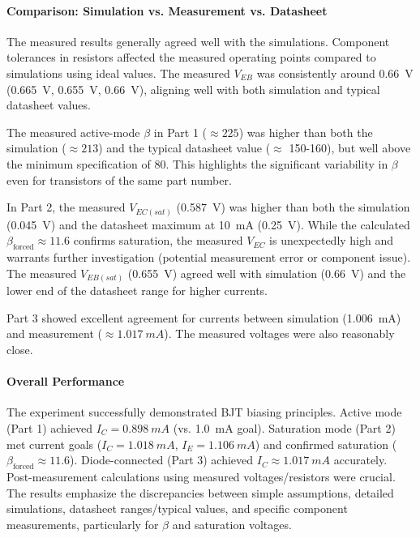 \documentclass[12pt]{article}
\begin{document}
\paragraph{Comparison: Simulation vs. Measurement vs. Datasheet}
The measured results generally agreed well with the simulations. Component tolerances in resistors affected the measured operating points compared to simulations using ideal values. The measured $V_{EB}$ was consistently around \SI{0.66}{\volt} (\SI{0.665}{\volt}, \SI{0.655}{\volt}, \SI{0.66}{\volt}), aligning well with both simulation and typical datasheet values.

The measured active-mode $\beta$ in Part 1 ($\approx 225$) was higher than both the simulation ($\approx 213$) and the typical datasheet value ($\approx$ 150-160), but well above the minimum specification of 80. This highlights the significant variability in $\beta$ even for transistors of the same part number.

In Part 2, the measured $V_{EC(sat)}$ (\SI{0.587}{\volt}) was higher than both the simulation (\SI{0.045}{\volt}) and the datasheet maximum at \SI{10}{mA} (\SI{0.25}{V}). While the calculated $\beta_{\text{forced}} \approx 11.6$ confirms saturation, the measured $V_{EC}$ is unexpectedly high and warrants further investigation (potential measurement error or component issue). The measured $V_{EB(sat)}$ (\SI{0.655}{\volt}) agreed well with simulation (\SI{0.66}{\volt}) and the lower end of the datasheet range for higher currents.

Part 3 showed excellent agreement for currents between simulation (\SI{1.006}{mA}) and measurement ($\approx \SI{1.017}{mA}$). The measured voltages were also reasonably close.

\paragraph{Overall Performance}
The experiment successfully demonstrated BJT biasing principles. Active mode (Part 1) achieved $I_C = \SI{0.898}{mA}$ (vs. \SI{1.0}{mA} goal). Saturation mode (Part 2) met current goals ($I_C=\SI{1.018}{mA}$, $I_E=\SI{1.106}{mA}$)  and confirmed saturation ($\beta_{\text{forced}} \approx 11.6$). Diode-connected (Part 3) achieved $I_C \approx \SI{1.017}{mA}$ accurately. Post-measurement calculations using measured voltages/resistors were crucial. The results emphasize the discrepancies between simple assumptions, detailed simulations, datasheet ranges/typical values, and specific component measurements, particularly for $\beta$ and saturation voltages.
\end{document}
